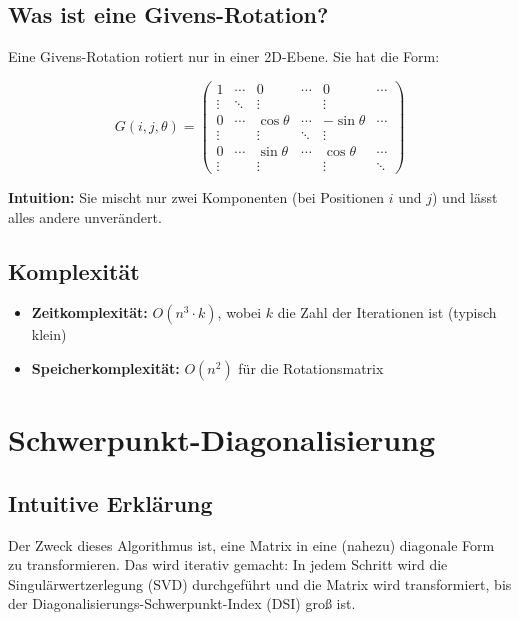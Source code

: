\documentclass[a4paper,12pt]{article}
\begin{document}
\subsection{Was ist eine Givens-Rotation?}

Eine Givens-Rotation rotiert nur in einer 2D-Ebene. Sie hat die Form:

$$G(i, j, \theta) = \begin{pmatrix}
1 & \cdots & 0 & \cdots & 0 & \cdots \\
\vdots & \ddots & \vdots & & \vdots & \\
0 & \cdots & \cos\theta & \cdots & -\sin\theta & \cdots \\
\vdots & & \vdots & \ddots & \vdots & \\
0 & \cdots & \sin\theta & \cdots & \cos\theta & \cdots \\
\vdots & & \vdots & & \vdots & \ddots
\end{pmatrix}$$

\textbf{Intuition:} Sie mischt nur zwei Komponenten (bei Positionen $i$ und $j$) und lässt alles andere unverändert.

\subsection{Komplexität}

\begin{itemize}
\item \textbf{Zeitkomplexität:} $O(n^3 \cdot k)$, wobei $k$ die Zahl der Iterationen ist (typisch klein)
\item \textbf{Speicherkomplexität:} $O(n^2)$ für die Rotationsmatrix
\end{itemize}


\section{Schwerpunkt-Diagonalisierung}

\subsection{Intuitive Erklärung}

Der Zweck dieses Algorithmus ist, eine Matrix in eine (nahezu) diagonale Form zu transformieren. Das wird iterativ gemacht: In jedem Schritt wird die Singulärwertzerlegung (SVD) durchgeführt und die Matrix wird transformiert, bis der Diagonalisierungs-Schwerpunkt-Index (DSI) groß ist.
\end{document}
